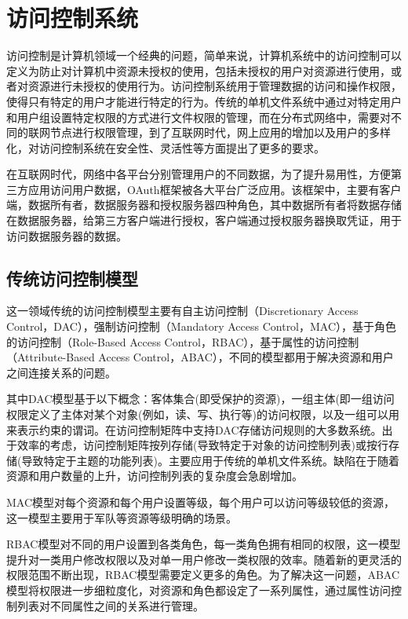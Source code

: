 
\chapter{访问控制系统}

访问控制是计算机领域一个经典的问题，简单来说，计算机系统中的访问控制可以定义为防止对计算机中资源未授权的使用，包括未授权的用户对资源进行使用，或者对资源进行未授权的使用行为。访问控制系统用于管理数据的访问和操作权限，使得只有特定的用户才能进行特定的行为。传统的单机文件系统中通过对特定用户和用户组设置特定权限的方式进行文件权限的管理，而在分布式网络中，需要对不同的联网节点进行权限管理，到了互联网时代，网上应用的增加以及用户的多样化，对访问控制系统在安全性、灵活性等方面提出了更多的要求。

在互联网时代，网络中各平台分别管理用户的不同数据，为了提升易用性，方便第三方应用访问用户数据，OAuth框架被各大平台广泛应用。该框架中，主要有客户端，数据所有者，数据服务器和授权服务器四种角色，其中数据所有者将数据存储在数据服务器，给第三方客户端进行授权，客户端通过授权服务器换取凭证，用于访问数据服务器的数据。

\section{传统访问控制模型}

这一领域传统的访问控制模型主要有自主访问控制（Discretionary Access Control，DAC），强制访问控制（Mandatory Access Control，MAC），基于角色的访问控制（Role-Based Access Control，RBAC），基于属性的访问控制（Attribute-Based Access Control，ABAC），不同的模型都用于解决资源和用户之间连接关系的问题。

其中DAC模型基于以下概念：客体集合(即受保护的资源)，一组主体(即一组访问权限定义了主体对某个对象(例如，读、写、执行等)的访问权限，以及一组可以用来表示约束的谓词。在访问控制矩阵中支持DAC存储访问规则的大多数系统。出于效率的考虑，访问控制矩阵按列存储(导致特定于对象的访问控制列表)或按行存储(导致特定于主题的功能列表)。主要应用于传统的单机文件系统。缺陷在于随着资源和用户数量的上升，访问控制列表的复杂度会急剧增加。

MAC模型对每个资源和每个用户设置等级，每个用户可以访问等级较低的资源，这一模型主要用于军队等资源等级明确的场景。

RBAC模型对不同的用户设置到各类角色，每一类角色拥有相同的权限，这一模型提升对一类用户修改权限以及对单一用户修改一类权限的效率。随着新的更灵活的权限范围不断出现，RBAC模型需要定义更多的角色。为了解决这一问题，ABAC模型将权限进一步细粒度化，对资源和角色都设定了一系列属性，通过属性访问控制列表对不同属性之间的关系进行管理。


